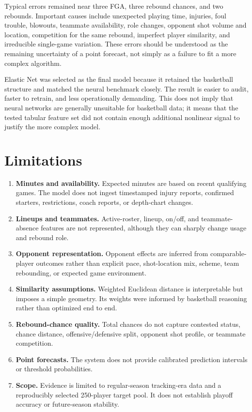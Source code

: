 \documentclass[11pt]{article}
\begin{document}
Typical errors remained near three FGA, three rebound chances, and two
rebounds. Important causes include unexpected playing time, injuries, foul
trouble, blowouts, teammate availability, role changes, opponent shot volume
and location, competition for the same rebound, imperfect player similarity,
and irreducible single-game variation. These errors should be understood as
the remaining uncertainty of a point forecast, not simply as a failure to fit
a more complex algorithm.

Elastic Net was selected as the final model because it retained the basketball
structure and matched the neural benchmark closely. The result is easier to
audit, faster to retrain, and less operationally demanding. This does not imply
that neural networks are generally unsuitable for basketball data; it means
that the tested tabular feature set did not contain enough additional nonlinear
signal to justify the more complex model.

\section{Limitations}

\begin{enumerate}
    \item \textbf{Minutes and availability.} Expected minutes are based on
    recent qualifying games. The model does not ingest timestamped injury
    reports, confirmed starters, restrictions, coach reports, or depth-chart
    changes.
    \item \textbf{Lineups and teammates.} Active-roster, lineup, on/off, and
    teammate-absence features are not represented, although they can sharply
    change usage and rebound role.
    \item \textbf{Opponent representation.} Opponent effects are inferred from
    comparable-player outcomes rather than explicit pace, shot-location mix,
    scheme, team rebounding, or expected game environment.
    \item \textbf{Similarity assumptions.} Weighted Euclidean distance is
    interpretable but imposes a simple geometry. Its weights were informed by
    basketball reasoning rather than optimized end to end.
    \item \textbf{Rebound-chance quality.} Total chances do not capture
    contested status, chance distance, offensive/defensive split, opponent shot
    profile, or teammate competition.
    \item \textbf{Point forecasts.} The system does not provide calibrated
    prediction intervals or threshold probabilities.
    \item \textbf{Scope.} Evidence is limited to regular-season tracking-era
    data and a reproducibly selected 250-player target pool. It does not
    establish playoff accuracy or future-season stability.
\end{enumerate}
\end{document}
